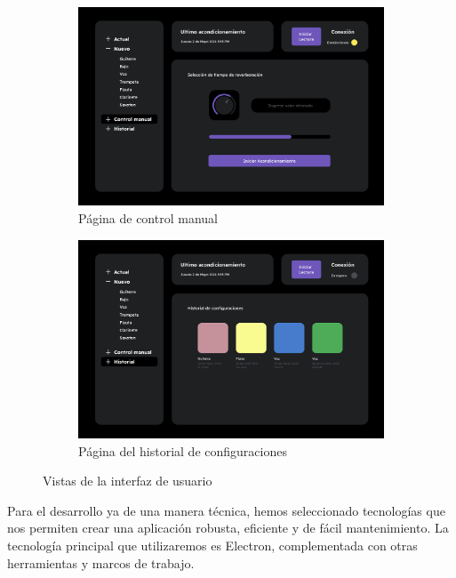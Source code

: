 \begin{figure}[!htb]
\begin{subfigure}{0.45\textwidth}
        \includegraphics[width=\linewidth]{imagenes/Control Manual.png}
        \caption{\footnotesize Página de control manual}
        \label{fig:pagina_manual}
    \end{subfigure}
    \hfill
    \begin{subfigure}{0.45\textwidth}
        \centering
        \includegraphics[width=\linewidth]{imagenes/Historial.png}
        \caption{\footnotesize Página del historial de configuraciones}
        \label{fig:pagina_historial}
    \end{subfigure}
    \caption{Vistas de la interfaz de usuario}
    \label{fig:vistas_interfaz}
\end{figure}
\FloatBarrier

Para el desarrollo ya de una manera técnica, hemos seleccionado tecnologías que nos permiten crear una aplicación robusta, eficiente y de fácil mantenimiento. La tecnología principal que utilizaremos es Electron, complementada con otras herramientas y marcos de trabajo. \\


